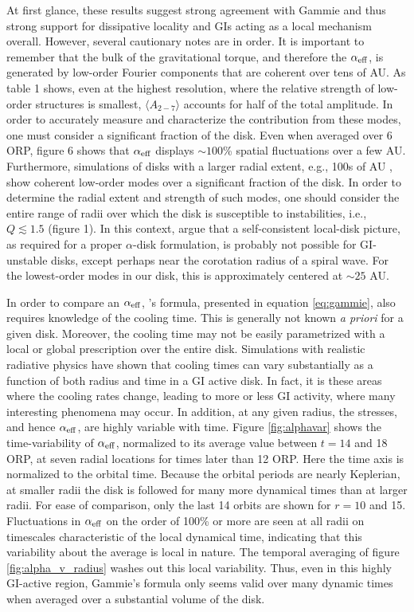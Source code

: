 \documentclass[manuscript]{aastex}
\begin{document}
At first glance, these results suggest strong agreement with Gammie and thus strong support for dissipative
locality and GIs acting as a local mechanism overall.  However, several cautionary notes are in order. It is important to remember that the bulk of the gravitational torque, and therefore the $\alpha_{\rm{eff}}$, is generated by low-order 
Fourier components that are coherent over tens of AU.  As table 1 shows, even at the highest resolution, where
the relative strength of low-order structures is smallest, $\langle A_{2-7} \rangle$ accounts for half of the total amplitude.
In order to accurately measure and characterize the contribution from these modes, one must consider a significant fraction of the disk. Even when averaged over 6 ORP, figure 6 shows that $\alpha_{\rm{eff}}$ displays $\sim 100$\% spatial fluctuations
over a few AU.
Furthermore, simulations of disks with a larger radial extent, e.g., 100s of AU \citep{boley2009}, show coherent 
low-order modes over a significant fraction of the disk. 
In order to determine the radial extent and strength of such modes, one should consider the entire range of radii over which the disk is susceptible to instabilities, i.e., $Q \lesssim 1.5$ (figure 1).  In this context,
\cite{balbus1999}
argue that a self-consistent local-disk picture, as required for a proper $\alpha$-disk formulation,
is probably not possible for GI-unstable disks,
except perhaps near the corotation radius of a spiral wave.
For the lowest-order modes in our disk, this is approximately centered at $\sim 25$ AU.

In order to compare an $\alpha_{\rm{eff}}$, \citeauthor{gammie2001}'s formula, presented in equation \eqref{eq:gammie}, also requires knowledge of the cooling time. This is generally not known {\it a priori} for a given disk. Moreover, the cooling time may not be easily parametrized with a local or global prescription over the entire disk. Simulations with realistic radiative physics \citep{boley2006} have shown that cooling times can vary substantially as a function of both radius and time in a GI active disk. In fact, it is these areas where the cooling rates change, leading to more or less GI activity, where many interesting phenomena may occur.
In addition, at any given radius, the
stresses, and hence $\alpha_{\rm{eff}}$, are highly variable with time.
Figure \ref{fig:alphavar} shows the time-variability of $\alpha_{\rm{eff}}$, 
normalized to its average value between $t = 14$ and 18 ORP, at seven radial locations
for times later than 12 ORP.
Here the time axis is normalized to the orbital time.  Because the orbital periods are nearly
Keplerian, at smaller radii the disk is followed for many more dynamical times than at larger
radii.  For ease of comparison, 
only the last 14 orbits are shown for $r = 10$ and 15.
Fluctuations in $\alpha_{\rm{eff}}$
on the order of 100\% or more are seen at all radii
on  timescales characteristic of the local dynamical time, indicating that
this variability about the average is local in nature.  The temporal averaging
of figure \ref{fig:alpha_v_radius} washes out this local variability.
Thus,
even in this highly GI-active region, Gammie's formula only seems valid over many dynamic times 
when averaged over a substantial volume of the disk. 
\end{document}
